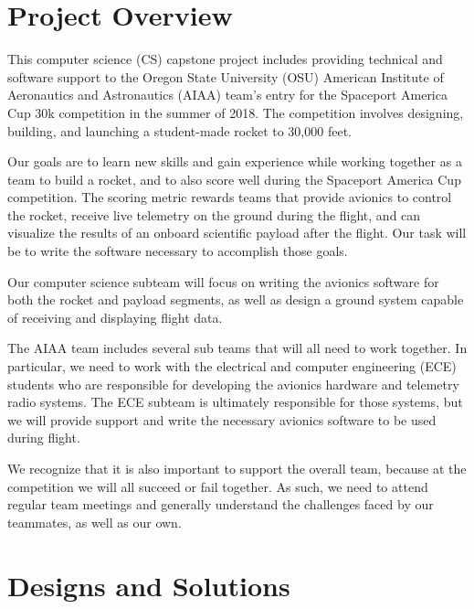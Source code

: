 \documentclass[onecolumn, draftclsnofoot, 10pt, compsoc]{IEEEtran}
\begin{document}

\tableofcontents

\newpage
\section{Project Overview}
This computer science (CS) capstone project includes providing technical and software support to the Oregon State University (OSU) American Institute of Aeronautics and Astronautics (AIAA) team's entry for the Spaceport America Cup 30k competition in the summer of 2018.  The competition involves designing, building, and launching a student-made rocket to 30,000 feet.

Our goals are to learn new skills and gain experience while working together as a team to build a rocket, and to also score well during the Spaceport America Cup competition.  The scoring metric rewards teams that provide avionics to control the rocket, receive live telemetry on the ground during the flight, and can visualize the results of an onboard scientific payload after the flight.  Our task will be to write the software necessary to accomplish those goals.

Our computer science subteam will focus on writing the avionics software for both the rocket and payload segments, as well as design a ground system capable of receiving and displaying flight data.

The AIAA team includes several sub teams that will all need to work together.  In particular, we need to work with the electrical and computer engineering (ECE) students who are responsible for developing the avionics hardware and telemetry radio systems.  The ECE subteam is ultimately responsible for those systems, but we will provide support and write the necessary avionics software to be used during flight.

We recognize that it is also important to support the overall team, because at the competition we will all succeed or fail together.  As such, we need to attend regular team meetings and generally understand the challenges faced by our teammates, as well as our own.


\section{Designs and Solutions}
\end{document}
